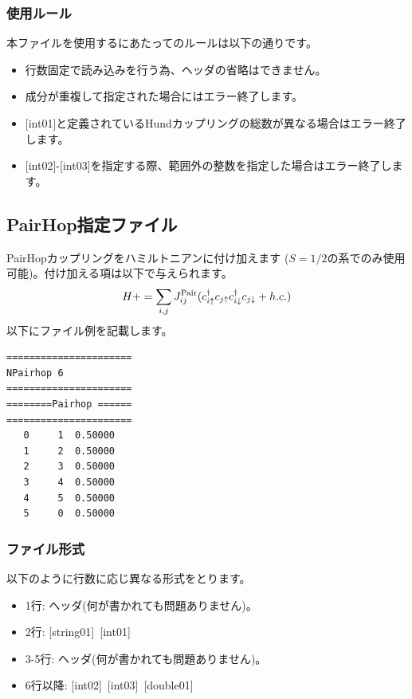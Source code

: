 \subsubsection{使用ルール}
本ファイルを使用するにあたってのルールは以下の通りです。
\begin{itemize}
\item 行数固定で読み込みを行う為、ヘッダの省略はできません。
\item 成分が重複して指定された場合にはエラー終了します。
\item $[$int01$]$と定義されているHundカップリングの総数が異なる場合はエラー終了します。
\item $[$int02$]$-$[$int03$]$を指定する際、範囲外の整数を指定した場合はエラー終了します。
\end{itemize}

\newpage
\subsection{PairHop指定ファイル}
PairHopカップリングをハミルトニアンに付け加えます{ ($S=1/2$の系でのみ使用可能)}。付け加える項は以下で与えられます。
\begin{equation}
H+=\sum_{i,j}J_{ij}^{\rm Pair} (c_ {i \uparrow}^{\dag}c_{j\uparrow}c_{i \downarrow}^{\dag}c_{j  \downarrow}+h.c.)
\end{equation}
以下にファイル例を記載します。

\begin{minipage}{12.5cm}
\begin{screen}
\begin{verbatim}
====================== 
NPairhop 6
====================== 
========Pairhop ====== 
====================== 
   0     1  0.50000
   1     2  0.50000
   2     3  0.50000
   3     4  0.50000
   4     5  0.50000
   5     0  0.50000
\end{verbatim}
\end{screen}
\end{minipage}

\subsubsection{ファイル形式}
以下のように行数に応じ異なる形式をとります。
 \begin{itemize}
   \item  1行:  ヘッダ(何が書かれても問題ありません)。
   \item  2行:   [string01]~[int01]
   \item  3-5行:  ヘッダ(何が書かれても問題ありません)。
   \item  6行以降:
   [int02]~[int03]~[double01] 
  \end{itemize}
